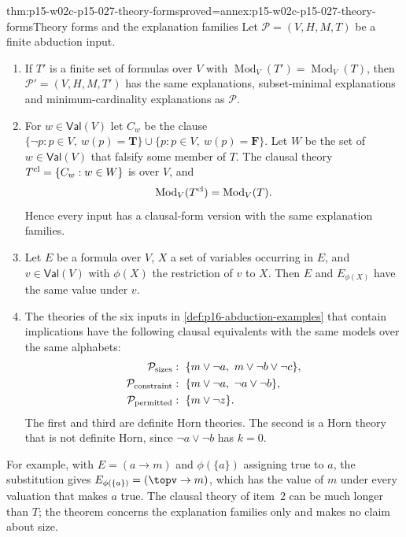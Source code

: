 \begin{hbtheorem}{thm:p15-w02c-p15-027-theory-forms}{proved=annex:p15-w02c-p15-027-theory-forms}{Theory forms and the explanation families}
Let \(\mathcal P=(V,H,M,T)\) be a finite abduction input.
\begin{enumerate}
\item If \(T'\) is a finite set of formulas over \(V\) with
      \(\operatorname{Mod}_V(T')=\operatorname{Mod}_V(T)\), then
      \(\mathcal P'=(V,H,M,T')\) has the same explanations,
      subset-minimal explanations and minimum-cardinality explanations
      as \(\mathcal P\).
\item For \(w\in\mathsf{Val}(V)\) let \(C_w\) be the clause
      \(\{\neg p:p\in V,\ w(p)=\mathbf T\}\cup\{p:p\in V,\ w(p)=\mathbf F\}\).
      Let \(W\) be the set of \(w\in\mathsf{Val}(V)\) that falsify some
      member of \(T\). The clausal theory
      \(T^{\rm cl}=\{C_w:w\in W\}\) is over \(V\), and
      \[
       \operatorname{Mod}_V(T^{\rm cl})=\operatorname{Mod}_V(T).
      \]
      Hence every input has a clausal-form version with the same
      explanation families.
\item Let \(E\) be a formula over \(V\), \(X\) a set of variables occurring
      in \(E\), and \(v\in\mathsf{Val}(V)\) with \(\phi(X)\) the restriction
      of \(v\) to \(X\). Then \(E\) and \(E_{\phi(X)}\) have the same value
      under \(v\).
\item The theories of the six inputs in \cref{def:p16-abduction-examples}
      that contain implications have the following clausal equivalents
      with the same models over the same alphabets:
      \[
      \begin{aligned}
       \mathcal P_{\rm sizes}&:\ \{m\lor\neg a,\ m\lor\neg b\lor\neg c\},\\
       \mathcal P_{\rm constraint}&:\ \{m\lor\neg a,\ \neg a\lor\neg b\},\\
       \mathcal P_{\rm permitted}&:\ \{m\lor\neg z\}.
      \end{aligned}
      \]
      The first and third are definite Horn theories. The second is a Horn
      theory that is not definite Horn, since \(\neg a\lor\neg b\) has
      \(k=0\).
\end{enumerate}
\end{hbtheorem}

For example, with \(E=(a\to m)\) and \(\phi(\{a\})\) assigning true to
\(a\), the substitution gives \(E_{\phi(\{a\})}=(\topv\to m)\), which has
the value of \(m\) under every valuation that makes \(a\) true. The
clausal theory of item~2 can be much longer than \(T\); the theorem
concerns the explanation families only and makes no claim about size.

